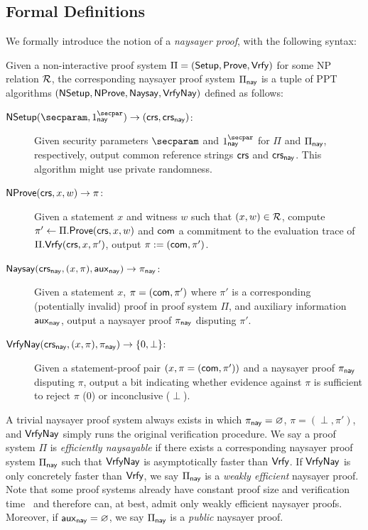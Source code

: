 \subsection{Formal Definitions}\label{sec:naysayer_def}

We formally introduce the notion of a \emph{naysayer proof}, with the following syntax:

\begin{definition} \label{def:naysayer_proof}
Given a non-interactive proof system $\Pi = (\mathsf{Setup}, \mathsf{Prove}, \mathsf{Vrfy})$ for some NP relation $\mathcal{R}$, the corresponding naysayer proof system $\Pi_{\mathsf{nay}}$ is a tuple of PPT algorithms $({\sf N}\mathsf{Setup}, {\sf N}\mathsf{Prove}, \mathsf{Naysay}, {\mathsf{Vrfy}}\mathsf{Nay})$ defined as follows:
    \begin{description}
        \item[${\sf N}\setup(\secparam, 1^\naysecparam) \rightarrow (\crs,\crs_{\nay})$:] Given security parameters $\secparam$ and $1^\naysecparam$ for $\Pi$ and $\Pi_{\mathsf{nay}}$, respectively, output common reference strings $\mathsf{crs}$ and $\mathsf{crs}_{\mathsf{nay}}$. This algorithm might use private randomness.
        \item[${\sf N}\mathsf{Prove}(\mathsf{crs}, x, w) \to \pi$:] Given a statement $x$ and witness $w$ such that $(x, w) \in \mathcal{R}$, compute $\pi' \gets \Pi.\mathsf{Prove}(\mathsf{crs}, x,w)$ and $\mathsf{com}$ a commitment to the evaluation trace of $\Pi.\mathsf{Vrfy}(\mathsf{crs}, x, \pi')$, output $\pi := (\mathsf{com}, \pi')$.
        \item[$\mathsf{Naysay}(\mathsf{crs}_{\mathsf{nay}}, (x,\pi), \mathsf{aux}_{\mathsf{nay}}) \rightarrow \pi_{\mathsf{nay}}$:] Given a statement $x$, $\pi = (\mathsf{com}, \pi')$ where $\pi'$ is a corresponding (potentially invalid) proof in proof system $\Pi$, and auxiliary information $\mathsf{aux}_{\mathsf{nay}}$, output a naysayer proof $\pi_{\mathsf{nay}}$ disputing $\pi'$. 
        \item[${\mathsf{Vrfy}}\mathsf{Nay}(\mathsf{crs}_{\mathsf{nay}}, (x,\pi), \pi_{\mathsf{nay}}) \rightarrow \{0, \perp\}$:] Given a statement-proof pair $(x, \pi=(\mathsf{com},\allowbreak\pi'))$ and a naysayer proof $\pi_{\mathsf{nay}}$ disputing $\pi$, output a bit indicating whether evidence against $\pi$ is sufficient to reject $\pi$ (0) or inconclusive ($\perp$).
    \end{description}
\end{definition}

A trivial naysayer proof system always exists in which $\pi_{\mathsf{nay}} = \varnothing$, $\pi = (\perp, \pi')$, and ${\mathsf{Vrfy}}\mathsf{Nay}$ simply runs the original verification procedure.
We say a proof system $\Pi$ is \emph{efficiently naysayable} if there exists a corresponding naysayer proof system $\Pi_{\mathsf{nay}}$ such that ${\mathsf{Vrfy}}\mathsf{Nay}$ is asymptotically faster than $\mathsf{Vrfy}$. If ${\mathsf{Vrfy}}\mathsf{Nay}$ is only concretely faster than $\mathsf{Vrfy}$, we say $\Pi_{\mathsf{nay}}$ is a \emph{weakly efficient} naysayer proof. Note that some proof systems already have constant proof size and verification time~\cite{EC:Groth16,C:Schnorr89} and therefore can, at best, admit only weakly efficient naysayer proofs. 
Moreover, if $\mathsf{aux}_{\mathsf{nay}} = \varnothing$, we say $\Pi_{\mathsf{nay}}$ is a \emph{public} naysayer proof. 

